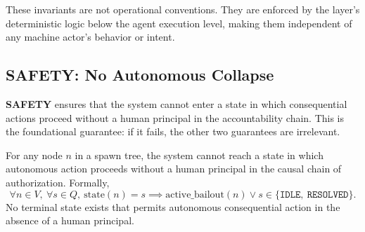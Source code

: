 These invariants are not operational conventions.  They are enforced by the
\fact{} layer's deterministic logic below the agent execution level, making them
independent of any machine actor's behavior or intent.

\subsection{SAFETY: No Autonomous Collapse}
\label{sec:safety}

\textbf{SAFETY} ensures that the system cannot enter a state in which
consequential actions proceed without a human principal in the accountability
chain.  This is the foundational guarantee: if it fails, the other two guarantees
are irrelevant.

\begin{theorem}
\label{th:safety}
For any node $n$ in a \bxthree{} spawn tree, the system cannot reach a state
in which autonomous action proceeds without a human principal in the causal chain
of authorization.  Formally,
\[
\forall n \in V,\ \forall s \in Q,\ \text{state}(n) = s \implies
\text{active\_bailout}(n) \lor s \in \{\texttt{IDLE},\ \texttt{RESOLVED}\}.
\]
No terminal state exists that permits autonomous consequential action in the
absence of a human principal.
\end{theorem}

